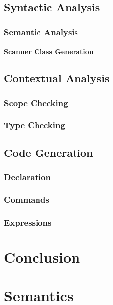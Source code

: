 \section{Syntactic Analysis}
\subsection{Semantic Analysis}
\subsubsection{Scanner Class Generation}
\section{Contextual Analysis}
\subsection{Scope Checking}
\subsection{Type Checking}
\section{Code Generation}
\subsection{Declaration}
\subsection{Commands}
\subsection{Expressions}

\renewcommand{\ind}[1]{}
\chapter{Conclusion}



\begingroup
	\raggedright
	{}	%
\endgroup


\newpage
\listoffixmes	%

\clearforchapter
\appendix	%


\renewcommand{\ind}[1]{}
\chapter{Semantics}
\ind{TransitionRules}
